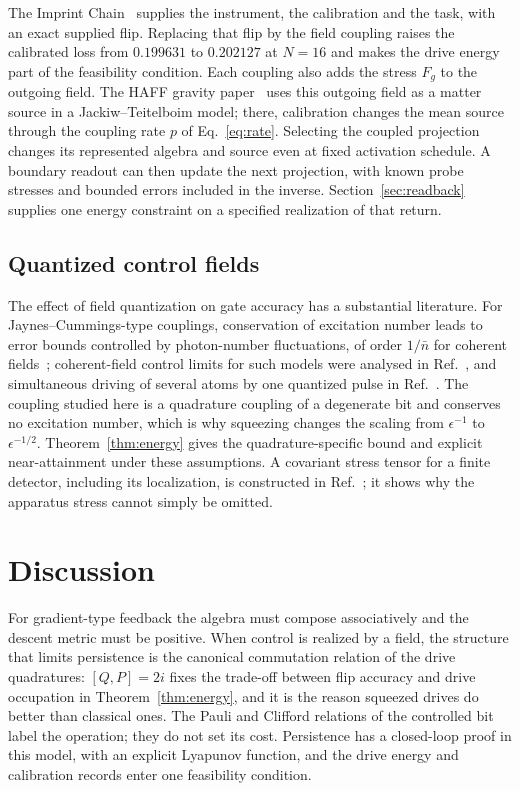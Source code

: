 \documentclass[aps,pre,onecolumn,superscriptaddress,floatfix,longbibliography]{revtex4-2}
\begin{document}
The Imprint Chain~\cite{Liu2026Chain} supplies the instrument, the calibration and the task, with an exact supplied flip. Replacing that flip by the field coupling raises the calibrated loss from $0.199631$ to $0.202127$ at $N=16$ and makes the drive energy part of the feasibility condition. Each coupling also adds the stress $F_g$ to the outgoing field. The HAFF gravity paper~\cite{Liu2026HAFFD} uses this outgoing field as a matter source in a Jackiw--Teitelboim model; there, calibration changes the mean source through the coupling rate $p$ of Eq.~\eqref{eq:rate}. Selecting the coupled projection changes its represented algebra and source even at fixed activation schedule. A boundary readout can then update the next projection, with known probe stresses and bounded errors included in the inverse. Section~\ref{sec:readback} supplies one energy constraint on a specified realization of that return.

\subsection{Quantized control fields}

The effect of field quantization on gate accuracy has a substantial literature. For Jaynes--Cummings-type couplings, conservation of excitation number leads to error bounds controlled by photon-number fluctuations, of order $1/\bar n$ for coherent fields~\cite{GeaBanaclocheOzawa2005}; coherent-field control limits for such models were analysed in Ref.~\cite{Igeta2013}, and simultaneous driving of several atoms by one quantized pulse in Ref.~\cite{Lindemann2025}. The coupling studied here is a quadrature coupling of a degenerate bit and conserves no excitation number, which is why squeezing changes the scaling from $\epsilon^{-1}$ to $\epsilon^{-1/2}$. Theorem~\ref{thm:energy} gives the quadrature-specific bound and explicit near-attainment under these assumptions. A covariant stress tensor for a finite detector, including its localization, is constructed in Ref.~\cite{Perche2025}; it shows why the apparatus stress cannot simply be omitted.

\section{Discussion}
\label{sec:discussion}

For gradient-type feedback the algebra must compose associatively and the descent metric must be positive. When control is realized by a field, the structure that limits persistence is the canonical commutation relation of the drive quadratures: $[Q,P]=2i$ fixes the trade-off between flip accuracy and drive occupation in Theorem~\ref{thm:energy}, and it is the reason squeezed drives do better than classical ones. The Pauli and Clifford relations of the controlled bit label the operation; they do not set its cost. Persistence has a closed-loop proof in this model, with an explicit Lyapunov function, and the drive energy and calibration records enter one feasibility condition.
\end{document}

